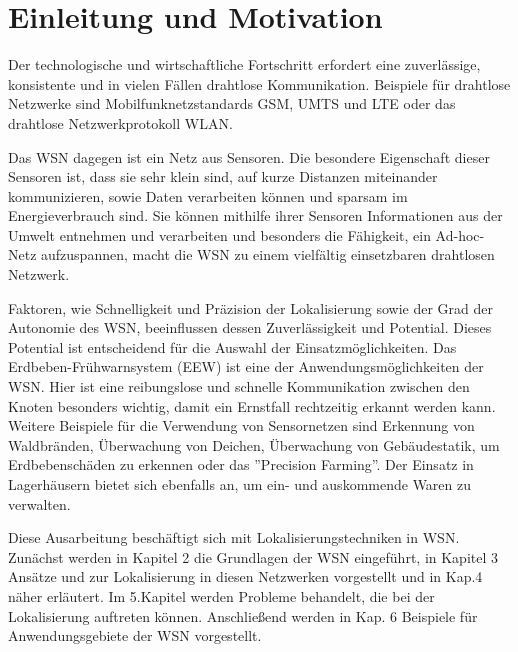 \documentclass[12pt, a4wide]{scrreprt}
\begin{document}
\tableofcontents
{}

\chapter{Einleitung und Motivation}
\renewcommand{\cleardoublepage}{}
\renewcommand{\clearpage}{}


\clearscrheadfoot
\pagestyle{scrheadings}
\rohead{\headmark}
\setheadsepline{.1pt}
\renewcommand*{\chapterpagestyle}{scrheadings}

Der technologische und wirtschaftliche Fortschritt erfordert eine zuverlässige, konsistente und in vielen Fällen drahtlose Kommunikation. Beispiele für drahtlose Netzwerke sind Mobilfunknetzstandards GSM, UMTS und LTE oder das drahtlose Netzwerkprotokoll WLAN.

Das \ac{WSN} dagegen ist ein Netz aus Sensoren. Die besondere Eigenschaft dieser Sensoren ist, dass sie sehr klein sind, auf kurze Distanzen miteinander kommunizieren, sowie Daten verarbeiten können und sparsam im Energieverbrauch sind. Sie können mithilfe ihrer Sensoren Informationen aus der Umwelt entnehmen und verarbeiten und besonders die Fähigkeit, ein Ad-hoc-Netz aufzuspannen, macht die \acs{WSN} zu einem vielfältig einsetzbaren drahtlosen Netzwerk.

Faktoren, wie Schnelligkeit und Präzision der Lokalisierung sowie der Grad der Autonomie des WSN, beeinflussen dessen Zuverlässigkeit und Potential. Dieses Potential ist entscheidend für die Auswahl der Einsatzmöglichkeiten. Das Erdbeben-Frühwarnsystem (EEW) ist eine der Anwendungsmöglichkeiten der \ac{WSN}. Hier ist eine reibungslose und schnelle Kommunikation zwischen den Knoten besonders wichtig, damit ein Ernstfall rechtzeitig erkannt werden kann. Weitere Beispiele für die Verwendung von Sensornetzen sind Erkennung von Waldbränden, Überwachung von Deichen, Überwachung von Gebäudestatik, um Erdbebenschäden zu erkennen\cite{building_monitoring} oder das ''Precision Farming''. Der Einsatz in Lagerhäusern bietet sich ebenfalls an, um ein- und auskommende Waren zu verwalten.

Diese Ausarbeitung beschäftigt sich mit Lokalisierungstechniken in \acs{WSN}. Zunächst werden in Kapitel 2 die Grundlagen der \acs{WSN} eingeführt, in Kapitel 3 Ansätze und zur Lokalisierung in diesen Netzwerken vorgestellt und in Kap.4 näher erläutert. Im 5.Kapitel werden Probleme behandelt, die bei der Lokalisierung auftreten können. Anschließend werden in Kap. 6 Beispiele für Anwendungsgebiete der \acs{WSN} vorgestellt.
\end{document}
